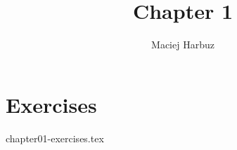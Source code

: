 \documentclass[12pt, a4paper]{article}
\title{Chapter 1}
\author{Maciej Harbuz}
\begin{document}
\maketitle

\section{Exercises}
%
{chapter01-exercises.tex}
\end{document}
